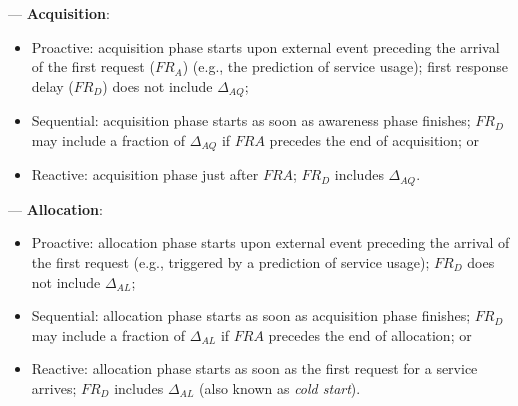 
--- \textbf{Acquisition}:

\begin{itemize}

\item Proactive: acquisition phase starts upon external event preceding the arrival of the first request ($FR_A$) (e.g., the prediction of service usage); first response delay ($FR_D$) does not include $\Delta_{AQ}$;

\item Sequential: acquisition phase starts as soon as awareness phase finishes; $FR_D$ may include a fraction of $\Delta_{AQ}$ if $FRA$ precedes the end of acquisition; or

\item Reactive: acquisition phase just after $FRA$; $FR_D$ includes $\Delta_{AQ}$.

\end{itemize}


--- \textbf{Allocation}:


\begin{itemize}

\item Proactive: allocation phase starts upon external event preceding the arrival of the first request (e.g., triggered by a prediction of service usage); $FR_D$ does not include $\Delta_{AL}$;

\item Sequential: allocation phase starts as soon as acquisition phase finishes; $FR_D$ may include a fraction of $\Delta_{AL}$ if $FRA$ precedes the end of allocation; or

\item Reactive: allocation phase starts as soon as the first request for a service arrives; $FR_D$ includes $\Delta_{AL}$ (also known as \textit{cold start}).

\end{itemize}

%
%
%
%


